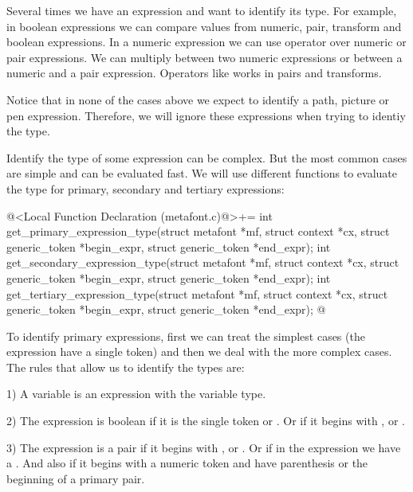{{{{{

Several times we have an expression and want to identify its type. For
example, in boolean expressions we can compare values from numeric,
pair, transform and boolean expressions. In a numeric expression we
can use  operator over numeric or pair
expressions. We can multiply between two numeric expressions or
between a numeric and a pair expression. Operators
like  works in pairs and transforms.

Notice that in none of the cases above we expect to identify a path,
picture or pen expression. Therefore, we will ignore these expressions
when trying to identiy the type.

Identify the type of some expression can be complex. But the most
common cases are simple and can be evaluated fast. We will use
different functions to evaluate the type for primary, secondary and
tertiary expressions:

\iniciocodigo
@<Local Function Declaration (metafont.c)@>+=
int get_primary_expression_type(struct metafont *mf, struct context *cx,
                               struct generic_token *begin_expr,
                               struct generic_token *end_expr);
int get_secondary_expression_type(struct metafont *mf, struct context *cx,
                                 struct generic_token *begin_expr,
                                 struct generic_token *end_expr);
int get_tertiary_expression_type(struct metafont *mf, struct context *cx,
                                struct generic_token *begin_expr,
                                struct generic_token *end_expr);
@
\fimcodigo

To identify primary expressions, first we can treat the simplest cases
(the expression have a single token) and then we deal with the more
complex cases. The rules that allow us to identify the types are:

1) A variable is an expression with the variable type.

2) The expression is boolean if it is the single
 token  or . Or if it begins
 with ,  or
.

3) The expression is a pair if it begins
 with , 
 or . Or if in the expression we have
 a \monoespaco{[}. And also if it begins with a numeric token and have
 parenthesis or the beginning of a primary pair.

}}}}}
